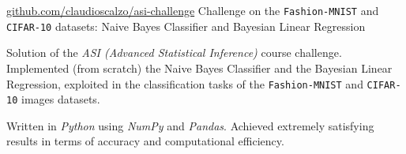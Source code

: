 \begin{cventries}
	
	\cvproj
		{\href{https://github.com/claudioscalzo/asi-challenge}{github.com/claudioscalzo/asi-challenge}}
		{Challenge on the \texttt{Fashion-MNIST} and \texttt{CIFAR-10} datasets: Naive Bayes Classifier and Bayesian Linear Regression}
		{}
		{}
		{
			\begin{cvitems} %
				\item {Solution of the \textit{ASI (Advanced Statistical Inference)} course challenge. Implemented (from scratch) the Naive Bayes Classifier and the Bayesian Linear Regression, exploited in the classification tasks of the \texttt{Fashion-MNIST} and \texttt{CIFAR-10} images datasets.}
				\item {Written in \textit{Python} using \textit{NumPy} and \textit{Pandas}. Achieved extremely satisfying results in terms of accuracy and computational efficiency.}
			\end{cvitems}
		}
\end{cventries}
